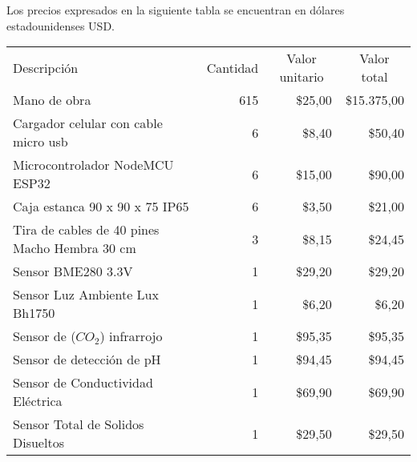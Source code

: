 Los precios expresados en la siguiente tabla se encuentran en dólares estadounidenses USD.

\begin{table}[htpb]
	\centering
	\begin{tabularx}{\linewidth}{@{}|X|c|r|r|@{}}
		\hline
		\rowcolor[HTML]{C0C0C0}
		\multicolumn{4}{|c|}{\cellcolor[HTML]{C0C0C0}COSTOS DIRECTOS}   \\ \hline
		\rowcolor[HTML]{C0C0C0}
		Descripción & \multicolumn{1}{c|}{\cellcolor[HTML]{C0C0C0}Cantidad} & 
		\multicolumn{1}{c|}{\cellcolor[HTML]{C0C0C0}Valor unitario} &
		\multicolumn{1}{c|}{\cellcolor[HTML]{C0C0C0}Valor total}\\ \hline
		Mano de obra & 
		\multicolumn{1}{r|}{615} & \multicolumn{1}{r|}{\$25,00} & \multicolumn{1}{r|}{\$15.375,00} \\ \hline
		Cargador celular con cable micro usb & 
		\multicolumn{1}{r|}{6} & \multicolumn{1}{r|}{\$8,40} & \multicolumn{1}{r|}{\$50,40} \\ \hline
		Microcontrolador NodeMCU ESP32 & 
		\multicolumn{1}{r|}{6} & \multicolumn{1}{r|}{\$15,00} & \multicolumn{1}{r|}{\$90,00} \\ \hline
		Caja estanca 90 x 90 x 75 IP65 & 
		\multicolumn{1}{r|}{6} & \multicolumn{1}{r|}{\$3,50} & \multicolumn{1}{r|}{\$21,00} \\ \hline
		Tira de cables de 40 pines Macho Hembra 30 cm & 
		\multicolumn{1}{r|}{3} & \multicolumn{1}{r|}{\$8,15} & \multicolumn{1}{r|}{\$24,45} \\ \hline
		Sensor BME280 3.3V & 
		\multicolumn{1}{r|}{1} & \multicolumn{1}{r|}{\$29,20} & \multicolumn{1}{r|}{\$29,20} \\ \hline
		Sensor Luz Ambiente Lux Bh1750 & 
		\multicolumn{1}{r|}{1} & \multicolumn{1}{r|}{\$6,20} & \multicolumn{1}{r|}{\$6,20} \\ \hline
		Sensor de ($CO_2$) infrarrojo  & 
		\multicolumn{1}{r|}{1} & \multicolumn{1}{r|}{\$95,35} & \multicolumn{1}{r|}{\$95,35} \\ \hline
		Sensor de detección de pH  & 
		\multicolumn{1}{r|}{1} & \multicolumn{1}{r|}{\$94,45} & \multicolumn{1}{r|}{\$94,45} \\ \hline
		Sensor de Conductividad Eléctrica   & 
		\multicolumn{1}{r|}{1} & \multicolumn{1}{r|}{\$69,90} & \multicolumn{1}{r|}{\$69,90} \\ \hline
		Sensor Total de Solidos Disueltos   & 
		\multicolumn{1}{r|}{1} & \multicolumn{1}{r|}{\$29,50} & \multicolumn{1}{r|}{\$29,50} \\ \hline

\end{tabularx}
\end{table}
